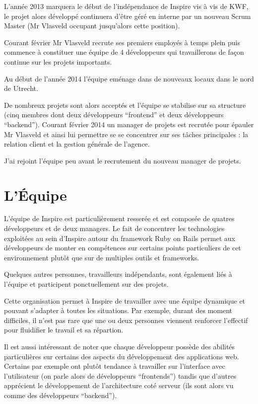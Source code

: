 \documentclass[12pt,a4paper]{book}
\begin{document}
L'année 2013 marquera le début de l'indépendance de Inspire vis à vis de KWF, le projet alors développé continuera d'être géré en interne par un nouveau Scrum Master (Mr Vlasveld occupant jusqu'alors cette position).

Courant février Mr Vlasveld recrute ses premiers employés à temps plein puis commence à constituer une équipe de 4 développeurs qui travaillerons de façon continue sur les projets importants.

Au début de l'année 2014 l'équipe eménage dans de nouveaux locaux dans le nord de Utrecht.

De nombreux projets sont alors acceptés et l'équipe se stabilise sur sa structure (cinq membres dont deux développeurs ``frontend'' et deux développeurs ``backend''). Courant février 2014 un manager de projets est recrutée pour épauler Mr Vlasveld et ainsi lui permettre se se concentrer sur ses tâches principales : la relation client et la gestion générale de l'agence.

J'ai rejoint l'équipe peu avant le recrutement du nouveau manager de projets.

\section{L'Équipe}

L'équipe de Inspire est particulièrement resserée et est composée de quatres développeurs et de deux managers. Le fait de concentrer les technologies exploitées au sein d'Inspire autour du framework Ruby on Rails permet aux développeurs de monter en compétences sur certains points particuliers de cet environnement plutôt que sur de multiples outils et frameworks.

Quelques autres personnes, travailleurs indépendants, sont également liés à l'équipe et participent ponctuellement sur des projets.

Cette organisation permet à Inspire de travailler avec une équipe dynamique et pouvant s'adapter à toutes les situations. Par exemple, durant des moment difficiles, il n'est pas rare que une ou deux personnes viennent renforcer l'effectif pour fluidifier le travail et sa répartion. 

Il est aussi intéressant de noter que chaque développeur possède des abilités particulières sur certains des aspects du développement des applications web. Certains par exemple ont plutôt tendance à travailler sur l'interface avec l'utilisateur (on parle alors de développeurs ``frontends'') tandis que d'autres apprécient le développement de l'architecture coté serveur (ils sont alors vu comme des développeurs ``backend'').
\end{document}
